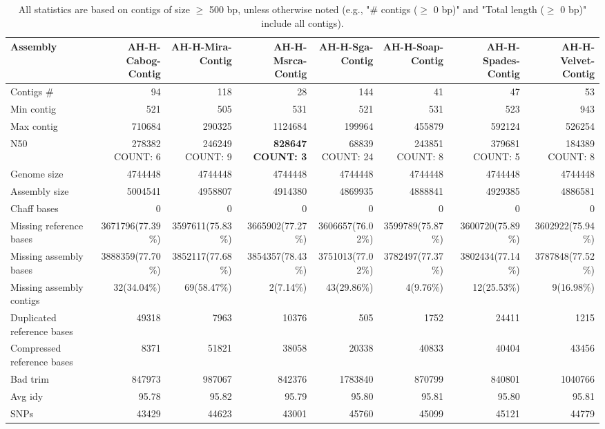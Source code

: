 \documentclass[12pt,a4paper]{article}
\begin{document}
\begin{table}[ht]
\begin{center}
\caption{All statistics are based on contigs of size $\geq$ 500 bp, unless otherwise noted (e.g., "\# contigs ($\geq$ 0 bp)" and "Total length ($\geq$ 0 bp)" include all contigs).}
\begin{tabular}{|l*{7}{|r}|}
\hline
Assembly & AH-H-Cabog-Contig & AH-H-Mira-Contig & AH-H-Msrca-Contig & AH-H-Sga-Contig & AH-H-Soap-Contig & AH-H-Spades-Contig & AH-H-Velvet-Contig \\ \hline
Contigs \# & 94 & 118 & 28 & 144 & 41 & 47 & 53 \\ \hline
Min contig & 521 & 505 & 531 & 521 & 531 & 523 & 943 \\ \hline
Max contig & 710684 & 290325 & 1124684 & 199964 & 455879 & 592124 & 526254 \\ \hline
N50 & 278382 COUNT: 6 & 246249 COUNT: 9 & {\bf 828647 COUNT: 3} & 68839 COUNT: 24 & 243851 COUNT: 8 & 379681 COUNT: 5 & 184389 COUNT: 8 \\ \hline
Genome size & 4744448 & 4744448 & 4744448 & 4744448 & 4744448 & 4744448 & 4744448 \\ \hline
Assembly size & 5004541 & 4958807 & 4914380 & 4869935 & 4888841 & 4929385 & 4886581 \\ \hline
Chaff bases & 0 & 0 & 0 & 0 & 0 & 0 & 0 \\ \hline
Missing reference bases & 3671796(77.39\%) & 3597611(75.83\%) & 3665902(77.27\%) & 3606657(76.02\%) & 3599789(75.87\%) & 3600720(75.89\%) & 3602922(75.94\%) \\ \hline
Missing assembly bases & 3888359(77.70\%) & 3852117(77.68\%) & 3854357(78.43\%) & 3751013(77.02\%) & 3782497(77.37\%) & 3802434(77.14\%) & 3787848(77.52\%) \\ \hline
Missing assembly contigs & 32(34.04\%) & 69(58.47\%) & 2(7.14\%) & 43(29.86\%) & 4(9.76\%) & 12(25.53\%) & 9(16.98\%) \\ \hline
Duplicated reference bases & 49318 & 7963 & 10376 & 505 & 1752 & 24411 & 1215 \\ \hline
Compressed reference bases & 8371 & 51821 & 38058 & 20338 & 40833 & 40404 & 43456 \\ \hline
Bad trim & 847973 & 987067 & 842376 & 1783840 & 870799 & 840801 & 1040766 \\ \hline
Avg idy & 95.78 & 95.82 & 95.79 & 95.80 & 95.81 & 95.80 & 95.81 \\ \hline
SNPs & 43429 & 44623 & 43001 & 45760 & 45099 & 45121 & 44779 \\ \hline

\end{tabular}
\end{center}
\end{table}
\end{document}
